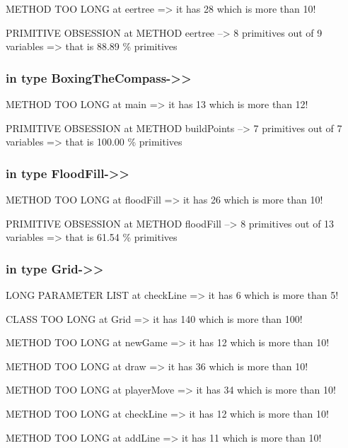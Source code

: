 \documentclass[a4paper]{article}
\begin{document}
\begin{flushleft}
	METHOD TOO LONG at eertree =\textgreater{} it has 28 which is more than
	10!

	PRIMITIVE OBSESSION at METHOD eertree --\textgreater{} 8 primitives out
	of 9 variables =\textgreater{} that is 88.89 \% primitives

	\subsubsection{in type
		BoxingTheCompass-\textgreater{}\textgreater{}}\label{in-type-boxingthecompass-}

	METHOD TOO LONG at main =\textgreater{} it has 13 which is more than 12!

	PRIMITIVE OBSESSION at METHOD buildPoints --\textgreater{} 7 primitives
	out of 7 variables =\textgreater{} that is 100.00 \% primitives

	\subsubsection{in type
		FloodFill-\textgreater{}\textgreater{}}\label{in-type-floodfill-}

	METHOD TOO LONG at floodFill =\textgreater{} it has 26 which is more
	than 10!

	PRIMITIVE OBSESSION at METHOD floodFill --\textgreater{} 8 primitives
	out of 13 variables =\textgreater{} that is 61.54 \% primitives

	\subsubsection{in type Grid-\textgreater{}\textgreater{}}\label{in-type-grid-}

	LONG PARAMETER LIST at checkLine =\textgreater{} it has 6 which is more
	than 5!

	CLASS TOO LONG at Grid =\textgreater{} it has 140 which is more than
	100!

	METHOD TOO LONG at newGame =\textgreater{} it has 12 which is more than
	10!

	METHOD TOO LONG at draw =\textgreater{} it has 36 which is more than 10!

	METHOD TOO LONG at playerMove =\textgreater{} it has 34 which is more
	than 10!

	METHOD TOO LONG at checkLine =\textgreater{} it has 12 which is more
	than 10!

	METHOD TOO LONG at addLine =\textgreater{} it has 11 which is more than
	10!


\end{flushleft}
\end{document}
